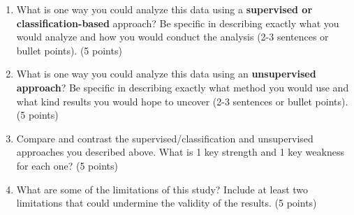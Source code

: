 \documentclass[12pt]{article}
\newcommand{\solution}[2]{#2} %
\begin{document}
\begin{enumerate}
\item What is one way you could analyze this data using a \textbf{supervised or classification-based} approach? Be specific in describing exactly what you would analyze and how you would conduct the analysis (2-3 sentences or bullet points). \hfill (5 points)
\solution{Label each data point for whether the student thinks the models are helpful or hurtful to education (or any other label that might be reasonable to study in this data). Labeling can be done by hand-annotating a training set and training a small classifier or through LLM-prompting. }{\vspace{8cm}}


\item What is one way you could analyze this data using an \textbf{unsupervised approach}? Be specific in describing exactly what method you would use and what kind results you would hope to uncover (2-3 sentences or bullet points). \hfill (5 points)
\solution{Use topic modeling (LDA, TopicGPT, CTM) to analyze broad trends in the data. }{\vspace{8cm}}

\item Compare and contrast the supervised/classification and unsupervised approaches you described above. What is 1 key strength and 1 key weakness for each one? \hfill (5 points)
\solution{Supervised: easier to control, can target specific research questions, but can be time-consuming to set-up and validate. Unsupervised: able to run with minimal initial manual labeling, can study exploratory questions without knowing specific research questions in advance, can be difficult to control and can reach the wrong conclusions if patterns are misinterpreted}{\vspace{8cm}}

\item What are some of the limitations of this study? Include at least two limitations that could undermine the validity of the results. \hfill (5 points)
\solution{Examples: students may not have been fully honest about AI usage and its impact, JHU students may not be representative of other universities, inaccurate/poorly validated models could lead to incorrect conclusions}{\vspace{8cm}}

\end{enumerate}
\end{document}
